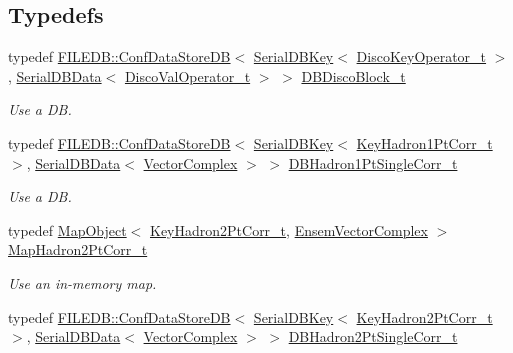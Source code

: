 \subsection*{Typedefs}
\begin{DoxyCompactItemize}
\item 
typedef \mbox{\hyperlink{classFILEDB_1_1ConfDataStoreDB}{F\+I\+L\+E\+D\+B\+::\+Conf\+Data\+Store\+DB}}$<$ \mbox{\hyperlink{classADATIO_1_1SerialDBKey}{Serial\+D\+B\+Key}}$<$ \mbox{\hyperlink{structFF_1_1DiscoKeyOperator__t}{Disco\+Key\+Operator\+\_\+t}} $>$, \mbox{\hyperlink{classADATIO_1_1SerialDBData}{Serial\+D\+B\+Data}}$<$ \mbox{\hyperlink{classFF_1_1DiscoValOperator__t}{Disco\+Val\+Operator\+\_\+t}} $>$ $>$ \mbox{\hyperlink{namespaceFF_afff37fccef0384964e1f8a8d20451ede}{D\+B\+Disco\+Block\+\_\+t}}
\begin{DoxyCompactList}\small\item\em Use a DB. \end{DoxyCompactList}\item 
typedef \mbox{\hyperlink{classFILEDB_1_1ConfDataStoreDB}{F\+I\+L\+E\+D\+B\+::\+Conf\+Data\+Store\+DB}}$<$ \mbox{\hyperlink{classADATIO_1_1SerialDBKey}{Serial\+D\+B\+Key}}$<$ \mbox{\hyperlink{structFF_1_1KeyHadron1PtCorr__t}{Key\+Hadron1\+Pt\+Corr\+\_\+t}} $>$, \mbox{\hyperlink{classADATIO_1_1SerialDBData}{Serial\+D\+B\+Data}}$<$ \mbox{\hyperlink{group__defs_gab151d837d71acacce0e1c38e91e04fa3}{Vector\+Complex}} $>$ $>$ \mbox{\hyperlink{namespaceFF_a6362d8690a549c09730022375eb4a613}{D\+B\+Hadron1\+Pt\+Single\+Corr\+\_\+t}}
\begin{DoxyCompactList}\small\item\em Use a DB. \end{DoxyCompactList}\item 
typedef \mbox{\hyperlink{classADAT_1_1MapObject}{Map\+Object}}$<$ \mbox{\hyperlink{structFF_1_1KeyHadron2PtCorr__t}{Key\+Hadron2\+Pt\+Corr\+\_\+t}}, \mbox{\hyperlink{group__defs_ga13b984332760feb8bc9c8f1071ade9ef}{Ensem\+Vector\+Complex}} $>$ \mbox{\hyperlink{namespaceFF_a11c2f2c7c42aaa20cce9292541df810a}{Map\+Hadron2\+Pt\+Corr\+\_\+t}}
\begin{DoxyCompactList}\small\item\em Use an in-\/memory map. \end{DoxyCompactList}\item 
typedef \mbox{\hyperlink{classFILEDB_1_1ConfDataStoreDB}{F\+I\+L\+E\+D\+B\+::\+Conf\+Data\+Store\+DB}}$<$ \mbox{\hyperlink{classADATIO_1_1SerialDBKey}{Serial\+D\+B\+Key}}$<$ \mbox{\hyperlink{structFF_1_1KeyHadron2PtCorr__t}{Key\+Hadron2\+Pt\+Corr\+\_\+t}} $>$, \mbox{\hyperlink{classADATIO_1_1SerialDBData}{Serial\+D\+B\+Data}}$<$ \mbox{\hyperlink{group__defs_gab151d837d71acacce0e1c38e91e04fa3}{Vector\+Complex}} $>$ $>$ \mbox{\hyperlink{namespaceFF_af452a146ecdd7f49ca3ca53a13987359}{D\+B\+Hadron2\+Pt\+Single\+Corr\+\_\+t}}

\end{DoxyCompactItemize}
